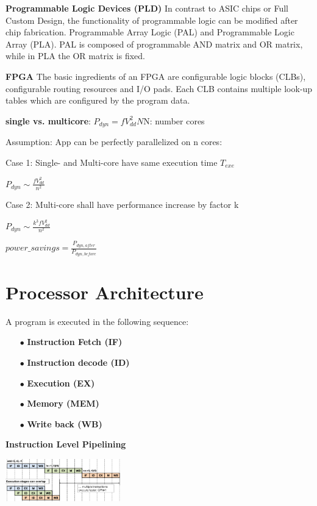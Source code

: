 \documentclass[english]{latex4ei/latex4ei_sheet}
\begin{document}
\textbf{Programmable Logic Devices (PLD)}
In contrast to ASIC chips or Full Custom Design, the functionality of programmable logic can be modified after chip fabrication.
Programmable Array Logic (PAL) and Programmable Logic Array (PLA). PAL is composed of programmable AND matrix and OR matrix, while in PLA the OR matrix is fixed.

\textbf{FPGA}
The basic ingredients of an FPGA are configurable logic blocks (CLBs), configurable routing resources and I/O pads. Each CLB contains multiple look-up tables which are configured by the program data.

\textbf{single vs. multicore}: 
$P_{dyn} = f V_{dd}^2 N $\quad N: number cores

Assumption: App can be perfectly parallelized on n cores:

Case 1: Single- and Multi-core have same execution time $T_{exe}$

$P_{dyn} \sim \frac{f V_{dd}^2}{n^2}$ 

Case 2: Multi-core shall have performance increase by factor k

$P_{dyn} \sim \frac{k^3 f V_{dd}^2}{n^2}$ 

$power\_savings = \frac{P_{dyn, after}}{P_{dyn, before}}$

\section{Processor Architecture}

A program is executed in the following sequence:
\begin{enumerate}
    \item[$\bullet$] \textbf{Instruction Fetch (IF)}
    \item[$\bullet$] \textbf{Instruction decode (ID)}
    \item[$\bullet$] \textbf{Execution (EX)}
    \item[$\bullet$] \textbf{Memory (MEM)}
    \item[$\bullet$] \textbf{Write back (WB)}
\end{enumerate}

\textbf{Instruction Level Pipelining}
\begin{center}
    \includegraphics[width = 5cm]{images/4.ProcessorArchitecture/ILP.png}
\end{center}
\end{document}
